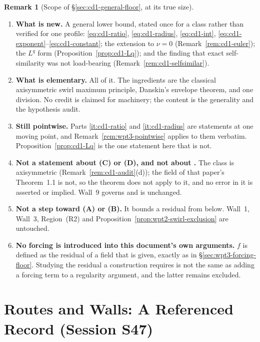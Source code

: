 \documentclass[11pt]{article}
\theoremstyle{definition}
\newtheorem{remark}[theorem]{Remark}
\theoremstyle{remark}
\begin{document}
\begin{remark}[Scope of \S\ref{sec:cd1-general-floor}, at its true size]
  \label{rem:cd1-scope}
  \begin{enumerate}[label=\textup{(\roman*)},leftmargin=2.6em]
    \item \textbf{What is new.} A general lower bound, stated once for a
      class rather than verified for one profile: \eqref{eq:cd1-ratio},
      \eqref{eq:cd1-radius}, \eqref{eq:cd1-int},
      \eqref{eq:cd1-exponent}--\eqref{eq:cd1-constant}; the extension to
      $\nu=0$ (Remark~\ref{rem:cd1-euler}); the $L^q$ form
      (Proposition~\ref{prop:cd1-Lq}); and the finding that exact
      self-similarity was not load-bearing
      (Remark~\ref{rem:cd1-selfsimilar}).
    \item \textbf{What is elementary.} All of it. The ingredients are the
      classical axisymmetric swirl maximum principle, Danskin's envelope
      theorem, and one division. No credit is claimed for machinery; the
      content is the generality and the hypothesis audit.
    \item \textbf{Still pointwise.} Parts \ref{it:cd1-ratio} and
      \ref{it:cd1-radius} are statements at one moving point, and
      Remark~\ref{rem:wpt3-pointwise} applies to them verbatim.
      Proposition~\ref{prop:cd1-Lq} is the one statement here that is not.
    \item\label{it:cd1-notCD} \textbf{Not a statement about (C) or (D), and
      not about \cite{OpenAI2026}.} The class is axisymmetric
      (Remark~\ref{rem:cd1-audit}(d)); the field of that paper's Theorem~1.1
      is not, so the theorem does not apply to it, and no error in it is
      asserted or implied. Wall~9 governs and is unchanged.
    \item \textbf{Not a step toward (A) or (B).} It bounds a residual from
      below. Wall~1, Wall~3, Region~(R2) and
      Proposition~\ref{prop:wpt2-swirl-exclusion} are untouched.
    \item \textbf{No forcing is introduced into this document's own
      arguments.} $f$ is defined as the residual of a field that is given,
      exactly as in \S\ref{sec:wpt3-forcing-floor}. Studying the residual a
      construction requires is not the same as adding a forcing term to a
      regularity argument, and the latter remains excluded.
  \end{enumerate}
\end{remark}

\section{Routes and Walls: A Referenced Record (Session S47)}
\label{sec:walls-s47}
\end{document}
